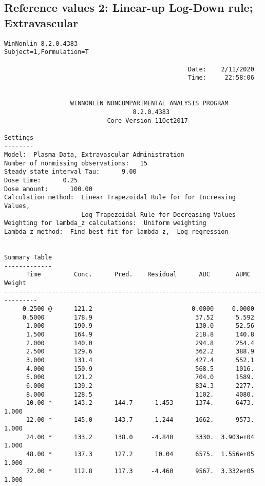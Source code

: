 \documentclass[12pt,a4paper]{article}
\begin{document}
\subsection{Reference values 2: Linear-up Log-Down rule; Extravascular}
\begin{verbatim}
WinNonlin 8.2.0.4383
Subject=1,Formulation=T

                                                  Date:    2/11/2020
                                                  Time:     22:58:06


                  WINNONLIN NONCOMPARTMENTAL ANALYSIS PROGRAM
                                   8.2.0.4383
                            Core Version 11Oct2017

Settings
--------
Model:  Plasma Data, Extravascular Administration
Number of nonmissing observations:   15
Steady state interval Tau:      9.00
Dose time:      0.25
Dose amount:      100.00
Calculation method:  Linear Trapezoidal Rule for for Increasing Values,
                     Log Trapezoidal Rule for Decreasing Values
Weighting for lambda_z calculations:  Uniform weighting
Lambda_z method:  Find best fit for lambda_z,  Log regression


Summary Table
-------------
      Time         Conc.      Pred.    Residual      AUC       AUMC      Weight
-------------------------------------------------------------------------------
     0.2500 @      121.2                           0.0000     0.0000
     0.5000        178.9                            37.52      5.592
      1.000        190.9                            130.0      52.56
      1.500        164.9                            218.8      140.8
      2.000        140.0                            294.8      254.4
      2.500        129.6                            362.2      388.9
      3.000        131.4                            427.4      552.1
      4.000        150.9                            568.5      1016.
      5.000        121.2                            704.0      1589.
      6.000        139.2                            834.3      2277.
      8.000        128.5                            1102.      4080.
      10.00 *      143.2      144.7     -1.453      1374.      6473.      1.000
      12.00 *      145.0      143.7      1.244      1662.      9573.      1.000
      24.00 *      133.2      138.0     -4.840      3330.  3.903e+04      1.000
      48.00 *      137.3      127.2      10.04      6575.  1.556e+05      1.000
      72.00 *      112.8      117.3     -4.460      9567.  3.332e+05      1.000



\end{verbatim}
\end{document}
